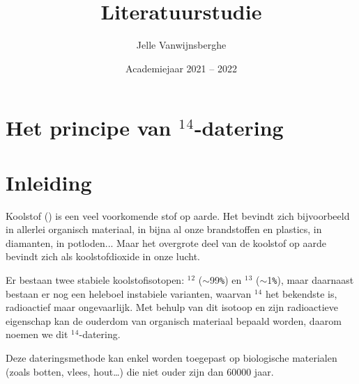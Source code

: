 \documentclass[kulak]{kulakarticle} %
\title{Literatuurstudie}
\author{Jelle Vanwijnsberghe}
\date{Academiejaar 2021 -- 2022}
\begin{document}
\maketitle

\section*{Het principe van $^1$$^4$-datering}

\section*{Inleiding}

Koolstof () is een veel voorkomende stof op aarde. Het bevindt zich bijvoorbeeld in allerlei organisch materiaal, in bijna al onze brandstoffen en plastics, in diamanten, in potloden... Maar het overgrote deel van de koolstof op aarde bevindt zich als koolstofdioxide in onze lucht. 

Er bestaan twee stabiele koolstofisotopen: $^1$$^2$ ($\sim$\num{99}\verb|%|) en $^1$$^3$ ($\sim$\num{1}\verb|%|), maar daarnaast bestaan er nog een heleboel instabiele varianten, waarvan $^1$$^4$ het bekendste is, radioactief maar ongevaarlijk. Met behulp van dit isotoop en zijn radioactieve eigenschap kan de ouderdom van organisch materiaal bepaald worden, daarom noemen we dit $^1$$^4$-datering.

Deze dateringsmethode kan enkel worden toegepast op biologische materialen (zoals botten, vlees, hout…) die niet ouder zijn dan \num{60000} jaar. 
\end{document}
